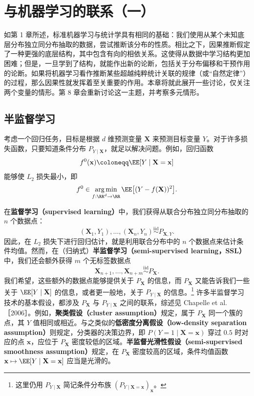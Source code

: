 \chapter{与机器学习的联系（一）}
\label{ch:machine-learning-one}

如第 1 章所述，标准机器学习与统计学具有相同的基础：我们使用从某个未知底层分布独立同分布抽取的数据，尝试推断该分布的性质。相比之下，因果推断假定了一种更强的底层结构，其中包含有向的相依关系。这使得从数据中学习结构更加困难；但是，一旦学到了结构，就能作出新的论断，包括关于分布偏移和干预作用的论断。如果将机器学习看作推断某些超越纯粹统计关联的规律（或“自然定律”）的过程，那么因果性就发挥着至关重要的作用。本章将就此展开一些讨论，仅关注两个变量的情形。第 8 章会重新讨论这一主题，并考察多元情形。

\section{半监督学习}
\label{sec:ch05-semi-supervised-learning}

考虑一个回归任务，目标是根据 $d$ 维预测变量 $\mathbf{X}$ 来预测目标变量 $Y$。对于许多损失函数，只要知道条件分布 $P_{Y\mid\mathbf{X}}$，就足以解决问题。例如，回归函数
\[
 f^0(\mathbf{x})\coloneqq\EE[Y\mid\mathbf{X}=\mathbf{x}]
\]
能够使 $L_2$ 损失最小，即
\[
 f^0\in\mathop{\mathrm{arg\,min}}_{f:\RR^d\to\RR}
 \EE\bigl[(Y-f(\mathbf{X}))^2\bigr].
\]

在\textbf{监督学习（supervised learning）}中，我们获得从联合分布独立同分布抽取的 $n$ 个数据点：
\[
 ( \mathbf{X}_1,Y_1),\ldots,(\mathbf{X}_n,Y_n)
 \overset{\mathrm{iid}}{\sim}P_{\mathbf{X},Y}.
\]
因此，在 $L_2$ 损失下进行回归估计，就是利用联合分布中的 $n$ 个数据点来估计条件均值。然而，在（归纳式）\textbf{半监督学习（semi-supervised learning，SSL）}中，我们还会额外获得 $m$ 个无标签数据点
\[
 \mathbf{X}_{n+1},\ldots,\mathbf{X}_{n+m}
 \overset{\mathrm{iid}}{\sim}P_{\mathbf{X}}.
\]
我们希望，这些额外的数据点能够提供关于 $P_{\mathbf{X}}$ 的信息，而 $P_{\mathbf{X}}$ 又能告诉我们一些关于 $\EE[Y\mid\mathbf{X}]$ 的信息，或者更一般地，关于 $P_{Y\mid\mathbf{X}}$ 的信息。\footnote{这里仍用 $P_{Y\mid\mathbf{X}}$ 简记条件分布族 $(P_{Y\mid\mathbf{X}=\mathbf{x}})_{\mathbf{x}}$。}
许多半监督学习技术的基本假设，都涉及 $P_{\mathbf{X}}$ 与 $P_{Y\mid\mathbf{X}}$ 之间的联系，综述见 Chapelle et al.［2006］。例如，\textbf{聚类假设（cluster assumption）}规定，属于 $P_{\mathbf{X}}$ 同一个簇的点，其 $Y$ 值相同或相近。与之类似的\textbf{低密度分离假设（low-density separation assumption）}则规定，分类器的决策边界，即 $P(Y=1\mid\mathbf{X}=\mathbf{x})$ 穿过 $0.5$ 时对应的点 $\mathbf{x}$，应位于 $P_{\mathbf{X}}$ 密度较低的区域。\textbf{半监督光滑性假设（semi-supervised smoothness assumption）}规定，在 $P_{\mathbf{X}}$ 密度较高的区域，条件均值函数 $\mathbf{x}\mapsto\EE[Y\mid\mathbf{X}=\mathbf{x}]$ 应当是光滑的。

